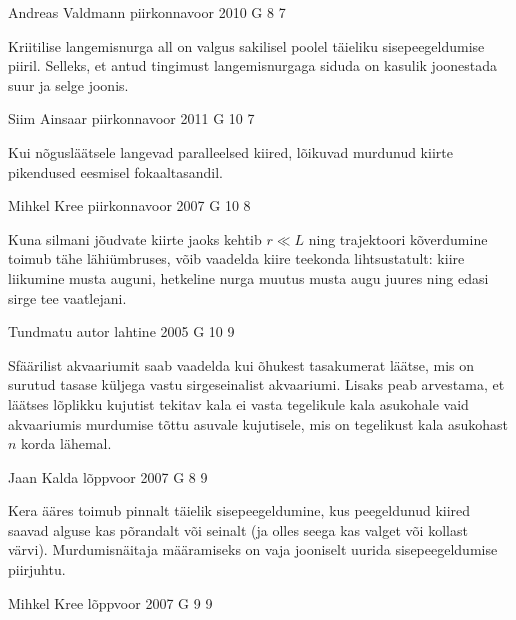 \documentclass[11pt]{article}
\begin{document}
{%
{Andreas Valdmann} %
{piirkonnavoor} %
{2010} %
{G 8} %
{7} %
{

\ifHint
Kriitilise langemisnurga all on valgus sakilisel poolel täieliku sisepeegeldumise piiril. Selleks, et antud tingimust langemisnurgaga siduda on kasulik joonestada suur ja selge joonis.
\fi
}

{Siim Ainsaar} %
{piirkonnavoor} %
{2011} %
{G 10} %
{7} %
{

\ifHint
Kui nõgusläätsele langevad paralleelsed kiired, lõikuvad
murdunud kiirte pikendused eesmisel fokaaltasandil.
\fi
}

{Mihkel Kree} %
{piirkonnavoor} %
{2007} %
{G 10} %
{8} %
{

\ifHint
Kuna silmani jõudvate kiirte jaoks kehtib $r \ll L$ ning trajektoori kõverdumine toimub tähe lähiümbruses, võib vaadelda kiire teekonda lihtsustatult: kiire liikumine musta auguni, hetkeline nurga muutus musta augu juures ning edasi sirge tee vaatlejani.
\fi
}

{Tundmatu autor} %
{lahtine} %
{2005} %
{G 10} %
{9} %
{

\ifHint
Sfäärilist akvaariumit saab vaadelda kui õhukest tasakumerat läätse, mis on surutud tasase küljega vastu sirgeseinalist akvaariumi. Lisaks peab arvestama, et läätses lõplikku kujutist tekitav kala ei vasta tegelikule kala asukohale vaid akvaariumis murdumise tõttu asuvale kujutisele, mis on tegelikust kala asukohast $n$ korda lähemal.
\fi
}

{Jaan Kalda} %
{lõppvoor} %
{2007} %
{G 8} %
{9} %
{

\ifHint
Kera ääres toimub pinnalt täielik sisepeegeldumine, kus peegeldunud kiired saavad alguse kas põrandalt või seinalt (ja olles seega kas valget või kollast värvi). Murdumisnäitaja määramiseks on vaja jooniselt uurida sisepeegeldumise piirjuhtu.
\fi
}

{Mihkel Kree} %
{lõppvoor} %
{2007} %
{G 9} %
{9} %
{

}}
\end{document}
